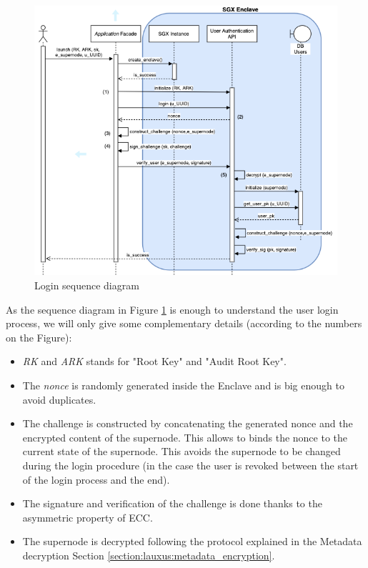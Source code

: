 \documentclass[../main.tex]{subfiles}
\begin{document}
\begin{figure}[ht]
    \centering
    \includegraphics[width=\textwidth]{images/lauxus/user_login}
    
    \caption{Login sequence diagram}
    \label{figure:lauxus:login}
\end{figure}
\par As the sequence diagram in Figure \ref{figure:lauxus:login} is enough to understand the user login process, we will only give some complementary details (according to the numbers on the Figure):
\begin{itemize}
    \item[1)] \textit{RK} and \textit{ARK} stands for "Root Key" and "Audit Root Key".
    \item[2)] The \textit{nonce} is randomly generated inside the Enclave and is big enough to avoid duplicates.
    \item[3)] The challenge is constructed by concatenating the generated nonce and the encrypted content of the supernode. This allows to binds the nonce to the current state of the supernode. This avoids the supernode to be changed during the login procedure (in the case the user is revoked between the start of the login process and the end).
    \item[4)] The signature and verification of the challenge is done thanks to the asymmetric property of ECC.
    \item[5)] The supernode is decrypted following the protocol explained in the Metadata decryption Section \ref{section:lauxus:metadata_encryption}.
\end{itemize}
\end{document}
